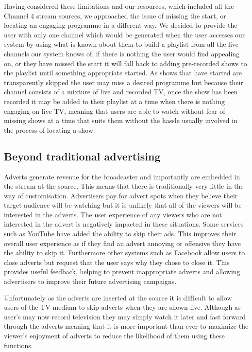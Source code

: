 Having considered these limitations and our resources, which included all the Channel 4 stream sources, we approached the issue of missing the start, or locating an engaging programme in a different way. We decided to provide the user with only one channel which would be generated when the user accesses our system by using what is known about them to build a playlist from all the live channels our system knows of, if there is nothing the user would find appealing on, or they have missed the start it will fall back to adding pre-recorded shows to the playlist until something appropriate started. As shows that have started are transparently skipped the user may miss a desired programme but because their channel consists of a mixture of live and recorded TV, once the show has been recorded it may be added to their playlist at a time when there is nothing engaging on live TV, meaning that users are able to watch without fear of missing shows at a time that suits them without the hassle usually involved in the process of locating a show.

\subsection{Beyond traditional advertising}
Adverts generate revenue for the broadcaster and importantly are embedded in the stream at the source. This means that there is traditionally very little in the way of customisation. Advertisers pay for advert spots when they believe their target audience will be watching but it is unlikely that all of the viewers will be interested in the adverts. The user experience of any viewers who are not interested in the advert is negatively impacted in these situations. Some services such as YouTube have added the ability to skip their ads. This improves their overall user experience as if they find an advert annoying or offensive they have the ability to skip it. Furthermore other systems such as Facebook allow users to close adverts but request that the user says why they chose to close it. This provides useful feedback, helping to prevent inappropriate adverts and allowing advertisers to improve their future advertising campaigns.

Unfortunately as the adverts are inserted at the source it is difficult to allow users of the TV medium to skip adverts when they are shown live. Although as user's may now record television they may simply watch it later and fast forward through the adverts meaning that it is more important than ever to maximize the viewer's enjoyment of adverts to reduce the likelihood of them using these functions.

